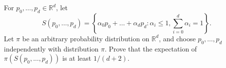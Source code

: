 For $p_0,\dots,p_d\in\mathbb{R}^d$, let
\[
S(p_0,\dots,p_d)=\left\{ \alpha_0p_0+\dots+\alpha_dp_d : \alpha_i\le 1, \sum_{i=0}^d \alpha_i =1 \right\}.
\]Let $\pi$ be an arbitrary probability distribution on $\mathbb{R}^d$, and choose $p_0,\dots,p_d$ independently with distribution $\pi$. Prove that the expectation of $\pi(S(p_0,\dots,p_d))$ is at least $1/(d+2)$.